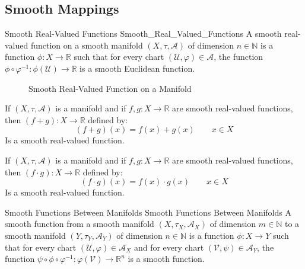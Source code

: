 \documentclass{article}                                                        %
\begin{document}
        \subsection{Smooth Mappings}
            \begin{fdefinition}{Smooth Real-Valued Functions}
                               {Smooth_Real_Valued_Functions}
                A smooth real-valued function on a smooth manifold
                $(X,\tau,\mathcal{A})$ of dimension $n\in\mathbb{N}$ is a
                function $\phi:X\rightarrow\mathbb{R}$ such that for every
                chart $(\mathcal{U},\varphi)\in\mathcal{A}$, the function
                $\phi\circ\varphi^{\minus{1}}:\phi(\mathcal{U})%
                 \rightarrow\mathbb{R}$ is a smooth Euclidean function.
            \end{fdefinition}
            \begin{figure}[H]
                \centering
                \captionsetup{type=figure}
                
                \caption{Smooth Real-Valued Function on a Manifold}
            \end{figure}
            \begin{theorem}
                If $(X,\tau,\mathcal{A})$ is a manifold and if
                $f,g:X\rightarrow\mathbb{R}$ are smooth real-valued functions,
                then $(f+g):X\rightarrow\mathbb{R}$ defined by:
                \begin{equation}
                    (f+g)(x)=f(x)+g(x)
                    \quad\quad
                    x\in{X}
                \end{equation}
                Is a smooth real-valued function.
            \end{theorem}
            \begin{theorem}
                If $(X,\tau,\mathcal{A})$ is a manifold and if
                $f,g:X\rightarrow\mathbb{R}$ are smooth real-valued functions,
                then $(f\cdot{g}):X\rightarrow\mathbb{R}$ defined by:
                \begin{equation}
                    (f\cdot{g})(x)=f(x)\cdot{g}(x)
                    \quad\quad
                    x\in{X}
                \end{equation}
                Is a smooth real-valued function.
            \end{theorem}
            \begin{fdefinition}{Smooth Functions Between Manifolds}
                               {Smooth Functions Between Manifolds}
                A smooth function from a smooth manifold
                $(X,\tau_{X},\mathcal{A}_{X})$ of dimension $m\in\mathbb{N}$
                to a smooth manifold $(Y,\tau_{Y},\mathcal{A}_{Y})$ of
                dimension $n\in\mathbb{N}$ is a function
                $\phi:X\rightarrow{Y}$ such that for every chart
                $(\mathcal{U},\varphi)\in\mathcal{A}_{X}$ and for every
                chart $(\mathcal{V},\psi)\in\mathcal{A}_{Y}$, the function
                $\psi\circ\phi\circ\varphi^{\minus{1}}:\varphi(\mathcal{V})%
                 \rightarrow\mathbb{R}^{n}$ is a smooth function.
            \end{fdefinition}
\end{document}
